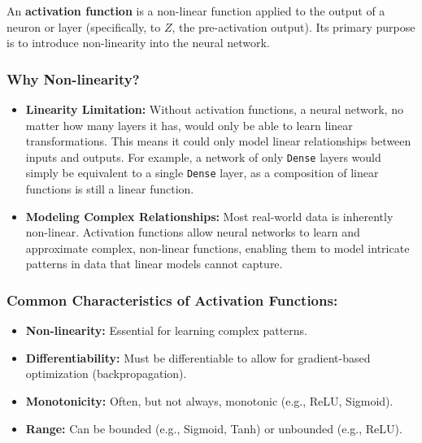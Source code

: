 \documentclass{article}
\begin{document}
An \textbf{activation function} is a non-linear function applied to the output of a neuron or layer (specifically, to $Z$, the pre-activation output). Its primary purpose is to introduce non-linearity into the neural network.

\subsubsection*{Why Non-linearity?}
\begin{itemize}
    \item \textbf{Linearity Limitation:} Without activation functions, a neural network, no matter how many layers it has, would only be able to learn linear transformations. This means it could only model linear relationships between inputs and outputs. For example, a network of only \texttt{Dense} layers would simply be equivalent to a single \texttt{Dense} layer, as a composition of linear functions is still a linear function.
    \item \textbf{Modeling Complex Relationships:} Most real-world data is inherently non-linear. Activation functions allow neural networks to learn and approximate complex, non-linear functions, enabling them to model intricate patterns in data that linear models cannot capture.
\end{itemize}

\subsubsection*{Common Characteristics of Activation Functions:}
\begin{itemize}
    \item \textbf{Non-linearity:} Essential for learning complex patterns.
    \item \textbf{Differentiability:} Must be differentiable to allow for gradient-based optimization (backpropagation).
    \item \textbf{Monotonicity:} Often, but not always, monotonic (e.g., ReLU, Sigmoid).
    \item \textbf{Range:} Can be bounded (e.g., Sigmoid, Tanh) or unbounded (e.g., ReLU).
\end{itemize}
\end{document}
